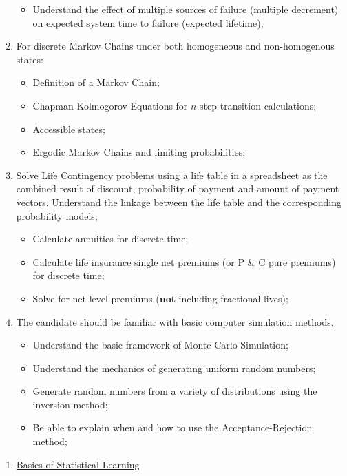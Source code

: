 \documentclass[12pt, titlepage, french]{report}
\begin{document}
\begin{outcomes}
\begin{enumerate}
\begin{itemize}
		\item	Understand the effect of multiple sources of failure (multiple decrement) on expected system time to failure (expected lifetime);
		\end{itemize}
\tcbline
	\item	For discrete Markov Chains under both homogeneous and non-homogenous states:	
		\begin{itemize}
		\item	Definition of a Markov Chain;
		\item	Chapman-Kolmogorov Equations for $n$-step transition calculations;
		\item	Accessible states;
		\item	Ergodic Markov Chains and limiting probabilities;
		\end{itemize}
\tcbline
	\item	Solve Life Contingency problems using a life table in a spreadsheet as the combined result of discount, probability of payment and amount of payment vectors. Understand the linkage between the life table and the corresponding probability models;
		\begin{itemize}
		\item	Calculate annuities for discrete time;
		\item	Calculate life insurance single net premiums (or P \& C pure premiums) for discrete time;
		\item	Solve for net level premiums (\textbf{not} including fractional lives);
		\end{itemize}
\tcbline
	\item	The candidate should be familiar with basic computer simulation methods.
		\begin{itemize}
		\item	Understand the basic framework of Monte Carlo Simulation;
		\item	Understand the mechanics of generating uniform random numbers;
		\item	Generate random numbers from a variety of distributions using the inversion method;
		\item	Be able to explain when and how to use the Acceptance-Rejection method;
		\end{itemize}
\end{enumerate}
\end{outcomes}

\begin{ASM_chapter}
\begin{enumerate}
	\item	\hyperref[BASICS]{Basics of Statistical Learning}
\end{enumerate}
\end{ASM_chapter}
\end{document}
